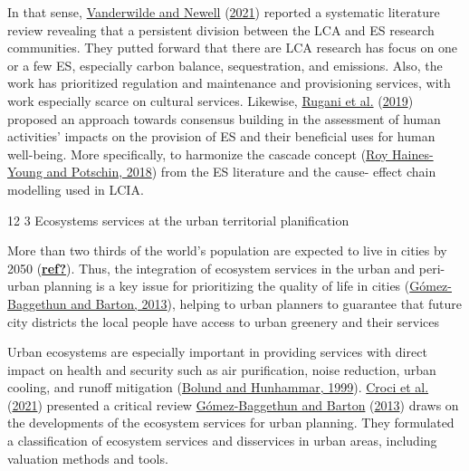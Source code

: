 \documentclass[]{elsarticle} %
\makeatletter
\renewcommand\subsection{\@startsection{subsection}{2}{\z@}%
         {12\p@ \@plus 6\p@ \@minus 3\p@}%
         {3\p@ \@plus 6\p@ \@minus 3\p@}%
         {\normalfont\normalsize\itshape\bfseries}}
\makeatother
\begin{document}
In that sense, \protect\hyperlink{ref-Vanderwilde2021}{Vanderwilde and Newell} (\protect\hyperlink{ref-Vanderwilde2021}{2021}) reported a systematic literature review revealing that a persistent division between the LCA and ES research communities.
They putted forward that there are LCA research has focus on one or a few ES, especially carbon balance, sequestration, and emissions.
Also, the work has prioritized regulation and maintenance and provisioning services, with work especially scarce on cultural services.
Likewise, \protect\hyperlink{ref-Rugani2019}{Rugani et al.} (\protect\hyperlink{ref-Rugani2019}{2019}) proposed an approach towards consensus building in the assessment of human activities' impacts on the provision of ES and their beneficial uses for human well-being. More specifically, to harmonize the cascade concept (\protect\hyperlink{ref-RoyHaines-Young2018}{Roy Haines-Young and Potschin, 2018}) from the ES literature and the cause- effect chain modelling used in LCIA.

\hypertarget{ecosystems-services-at-the-urban-territorial-planification}{%
\subsection{Ecosystems services at the urban territorial planification}\label{ecosystems-services-at-the-urban-territorial-planification}}

More than two thirds of the world's population are expected to live in cities by 2050 (\protect\hyperlink{ref-ref}{\textbf{ref?}}).
Thus, the integration of ecosystem services in the urban and peri-urban planning is a key issue for prioritizing the quality of life in cities (\protect\hyperlink{ref-Gomez-Baggethun2013}{Gómez-Baggethun and Barton, 2013}), helping to urban planners to guarantee that future city districts the local people have access to urban greenery and their services

Urban ecosystems are especially important in providing services with direct impact on health and security such as air purification, noise reduction, urban cooling, and runoff mitigation (\protect\hyperlink{ref-Bolund1999}{Bolund and Hunhammar, 1999}).
\protect\hyperlink{ref-Croci2021}{Croci et al.} (\protect\hyperlink{ref-Croci2021}{2021}) presented a critical review
\protect\hyperlink{ref-Gomez-Baggethun2013}{Gómez-Baggethun and Barton} (\protect\hyperlink{ref-Gomez-Baggethun2013}{2013}) draws on the developments of the ecosystem services for urban planning.
They formulated a classification of ecosystem services and disservices in urban areas, including valuation methods and tools.
\end{document}
